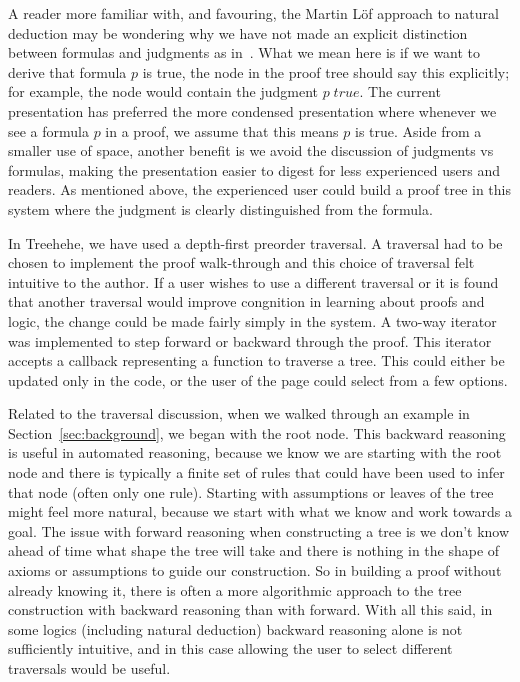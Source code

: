 \documentclass[conference]{IEEEtran}
\newcommand{\projectname}{Treehehe}
\begin{document}
A reader more familiar with, and favouring, the Martin L{\"o}f approach to natural deduction may be wondering why we have not made an explicit distinction between formulas and judgments as in~\cite{natded-pfenning}. What we mean here is if we want to derive that formula $p$ is true, the node in the proof tree should say this explicitly; for example, the node would contain the judgment $p \; \mathit{true}$. The current presentation has preferred the more condensed presentation where whenever we see a formula $p$ in a proof, we assume that this means $p$ is true. Aside from a smaller use of space, another benefit is we avoid the discussion of judgments vs formulas, making the presentation easier to digest for less experienced users and readers. As mentioned above, the experienced user could build a proof tree in this system where the judgment is clearly distinguished from the formula.

In \projectname{}, we have used a depth-first preorder traversal. A traversal had to be chosen to implement the proof walk-through and this choice of traversal felt intuitive to the author. If a user wishes to use a different traversal or it is found that another traversal would improve congnition in learning about proofs and logic, the change could be made fairly simply in the system. A two-way iterator was implemented to step forward or backward through the proof. This iterator accepts a callback representing a function to traverse a tree. This could either be updated only in the code, or the user of the page could select from a few options.

Related to the traversal discussion, when we walked through an example in Section~\ref{sec:background}, we began with the root node. This backward reasoning is useful in automated reasoning, because we know we are starting with the root node and there is typically a finite set of rules that could have been used to infer that node (often only one rule). Starting with assumptions or leaves of the tree might feel more natural, because we start with what we know and work towards a goal. The issue with forward reasoning when constructing a tree is we don't know ahead of time what shape the tree will take and there is nothing in the shape of axioms or assumptions to guide our construction. So in building a proof without already knowing it, there is often a more algorithmic approach to the tree construction with backward reasoning than with forward. With all this said, in some logics (including natural deduction) backward reasoning alone is not sufficiently intuitive, and in this case allowing the user to select different traversals would be useful.
\end{document}
